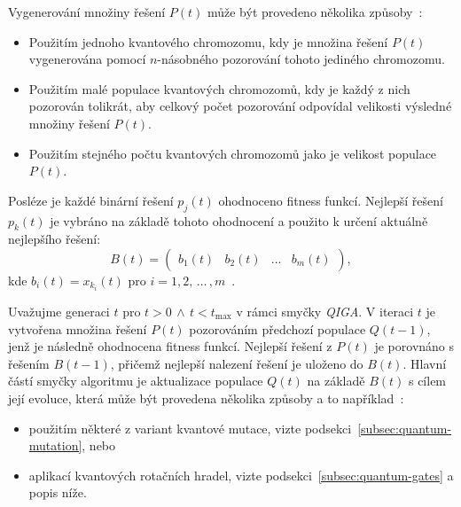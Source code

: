 Vygenerování množiny řešení $P\left(t\right)$ může být provedeno několika způsoby~\cite{NaturalComputing}:
\begin{itemize}
    \item Použitím jednoho kvantového chromozomu, kdy je množina řešení $P\left(t\right)$ vygenerována pomocí $n$-násobného pozorování tohoto jediného chromozomu. 
    \item Použitím malé populace kvantových chromozomů, kdy je každý z nich pozorován tolikrát, aby celkový počet pozorování odpovídal velikosti výsledné množiny řešení $P\left(t\right)$.
    \item Použitím stejného počtu kvantových chromozomů jako je velikost populace $P\left(t\right)$.
\end{itemize}

Posléze je každé binární řešení $p_j\left(t\right)$ ohodnoceno fitness funkcí. 
Nejlepší řešení $p_k\left(t\right)$ je vybráno na základě tohoto ohodnocení a použito k určení aktuálně nejlepšího řešení:
\begin{equation*}
    B\left(t\right) =
    \begin{pmatrix}
        b_1\left(t\right) & b_2\left(t\right) & \dots & b_m\left(t\right)
    \end{pmatrix},
\end{equation*}
kde $b_i\left(t\right) = x_{k_i}\left(t\right)$ pro $i = 1,2,\,\dots\,,m$~\cite{NaturalComputing,qiga}.

Uvažujme generaci $t$ pro $t>0\,\wedge\,t<t_{\text{max}}$ v rámci smyčky \emph{QIGA}. 
V iteraci $t$ je vytvořena množina řešení $P\left(t\right)$ pozorováním předchozí populace $Q\left(t-1\right)$, jenž je následně ohodnocena fitness funkcí. 
Nejlepší řešení z $P\left(t\right)$ je porovnáno s řešením $B\left(t-1\right)$, přičemž nejlepší nalezení řešení je uloženo do $B\left(t\right)$. 
Hlavní částí smyčky algoritmu je aktualizace populace $Q\left(t\right)$ na základě $B\left(t\right)$ s cílem její evoluce, která může být provedena několika způsoby a to například~\cite{NaturalComputing}:
\begin{itemize}
    \item použitím některé z variant kvantové mutace, vizte podsekci~\ref{subsec:quantum-mutation}, nebo
    \item aplikací kvantových rotačních hradel, vizte podsekci~\ref{subsec:quantum-gates} a popis níže.
\end{itemize}

